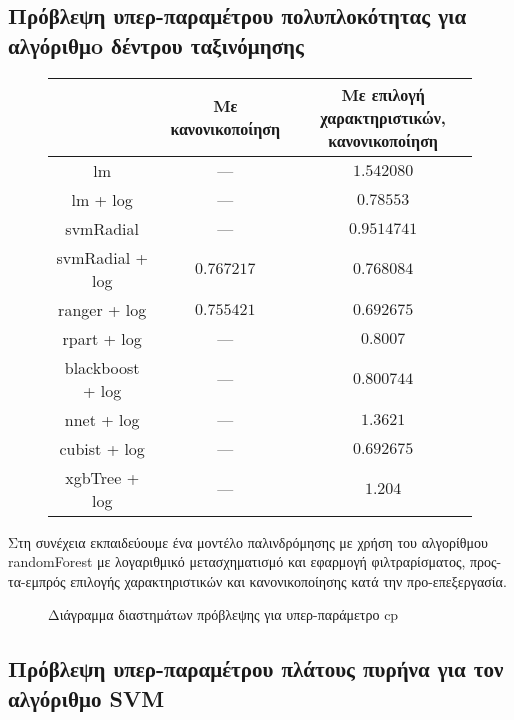 \subsection{Πρόβλεψη υπερ-παραμέτρου πολυπλοκότητας για αλγόριθμo δέντρου ταξινόμησης} 
\begin{figure}[!htb]
	\footnotesize
	\begin{center}
		\begin{tabular}{ |c|c|c| } 
			\hline
			 & Με κανονικοποίηση & \pbox{20cm}{ Με επιλογή χαρακτηριστικών,\\ κανονικοποίηση} \\
			 \hline
			lm & --- & $1.542080$  \\
			\hline
			lm + log & --- & $0.78553$\\
			\hline
			svmRadial & --- & $0.9514741$\\
			\hline
			svmRadial + log& $0.767217$& $0.768084$\\
			\hline
			ranger + log  &$0.755421$&$\bm{0.692675}$\\
			\hline
			rpart + log & --- &$0.8007$\\
			\hline
			blackboost + log & --- & $0.800744$ \\
			\hline
			nnet + log  & --- & $1.3621$\\
			\hline
			cubist + log & --- & $\bm{0.692675}$ \\
			\hline
			xgbTree + log & --- & $1.204$\\
			\hline
		\end{tabular}   
	\end{center}
\end{figure}

Στη συνέχεια εκπαιδεύουμε ένα μοντέλο παλινδρόμησης με χρήση του αλγορίθμου randomForest με λογαριθμικό μετασχηματισμό και εφαρμογή φιλτραρίσματος, προς-τα-εμπρός επιλογής χαρακτηριστικών και κανονικοποίησης κατά την προ-επεξεργασία.

\begin{figure}[!htb]
	\scalebox{0.85}{
}
\caption[Διάγραμμα διαστημάτων πρόβλεψης για υπερ-παράμετρο cp]{Διάγραμμα διαστημάτων πρόβλεψης για υπερ-παράμετρο cp}
\end{figure}
\FloatBarrier
\subsection{Πρόβλεψη υπερ-παραμέτρου πλάτους πυρήνα για τον αλγόριθμο \gls{SVM}} 

